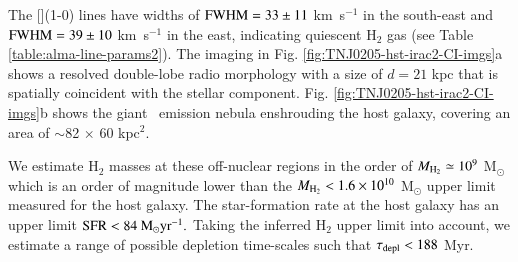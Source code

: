 The [](1-0) lines have widths of $\rm FWHM=33\pm11$ km~s$^{-1}$ in the south-east and $\rm FWHM=39\pm10$ km~s$^{-1}$ in the east, indicating quiescent H$_2$ gas (see Table \ref{table:alma-line-params2}). The imaging in Fig. \ref{fig:TNJ0205-hst-irac2-CI-imgs}a shows a resolved double-lobe radio morphology with a size of $d=21$ kpc that is spatially coincident with the stellar component. Fig. \ref{fig:TNJ0205-hst-irac2-CI-imgs}b shows the giant \lya~emission nebula enshrouding the host galaxy, covering an area of $\sim$82 $\times$ 60 kpc$^2.$ 

We estimate H$_2$ masses at these off-nuclear regions in the order of $M_{\rm H_2}\simeq10^{9}$ M$_\odot$ which is an order of magnitude lower than the $M_{\rm H_2} < 1.6\times 10^{10}$ M$_\odot$ upper limit measured for the host galaxy. The star-formation rate at the host galaxy has an upper limit $\rm SFR < 84~M_\odot yr^{-1}.$ Taking the inferred H$_2$ upper limit into account, we estimate a range of possible depletion time-scales such that $\tau_{\rm depl} < 188$ Myr. 

